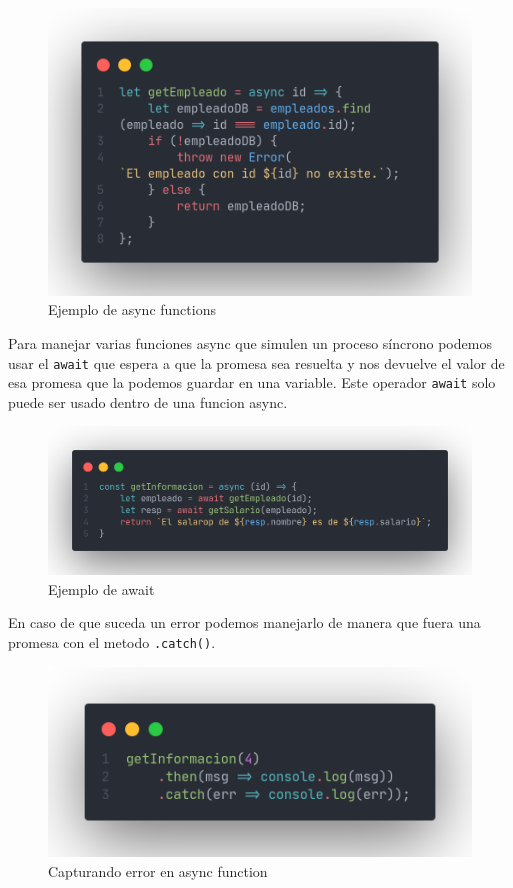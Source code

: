 \documentclass[12pt]{article}
\begin{document}
\begin{figure}[H]
	\centering
	\includegraphics[scale=.3]{assets/images/async.png}
	\caption{Ejemplo de async functions}
\end{figure}

Para manejar varias funciones async que simulen un proceso síncrono podemos usar el \lstinline{await} que espera a que la promesa sea resuelta y nos devuelve el valor de esa promesa que la podemos guardar en una variable. 
Este operador \lstinline{await} solo puede ser usado dentro de una funcion async.

\begin{figure}[H]
	\centering
	\includegraphics[scale=.28]{assets/images/await.png}
	\caption{Ejemplo de await}
\end{figure}

En caso de que suceda un error podemos manejarlo de manera que fuera una promesa con el metodo \lstinline{.catch()}.

\begin{figure}[H]
	\centering
	\includegraphics[scale=.3]{assets/images/await-2.png}
	\caption{Capturando error en async function}
\end{figure}
				
\end{document}
